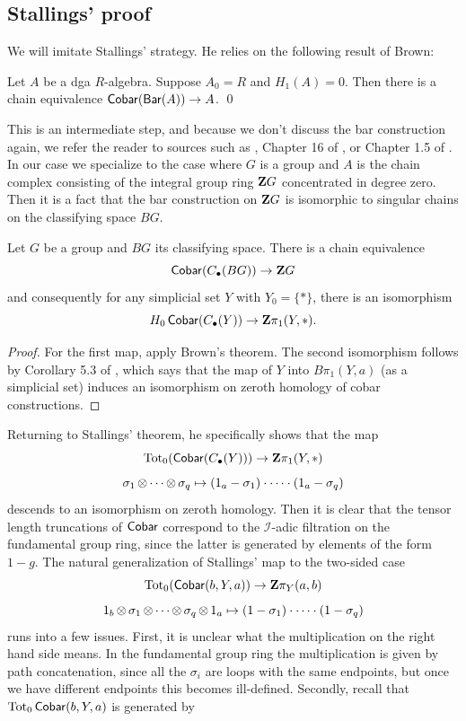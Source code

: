 \subsection{Stallings' proof} We will imitate Stallings' strategy. He relies on the following result of Brown:
\begin{thm}
    Let $A$ be a dga $R$-algebra. Suppose $A_0  = R$ and $H_1(A) = 0$. Then there is a chain equivalence $\operatorname{\mathsf{Cobar}}(\operatorname{\mathsf{Bar}}(A)) \to A$. \hfill \qed
\end{thm}
 This is an intermediate step, and because we don't discuss the bar construction again, we refer the reader to sources such as \cite{Milgram1967}, Chapter 16 of \cite{Brown1982}, or Chapter 1.5 of \cite{May1999-tb}. In our case we specialize to the case where $G$ is a group and $A$ is the chain complex consisting of the integral group ring $\mathbf{Z} G$ concentrated in degree zero. Then it is a fact that the bar construction on $\mathbf{Z} G$ is isomorphic to singular chains on the classifying space $BG$.
\begin{prop}\label{prop:cobar_zg}
    Let $G$ be a group and $BG$ its classifying space. There is a chain equivalence 
    \[\operatorname{\mathsf{Cobar}}(C_\bullet(BG)) \to \mathbf{Z} G\]
    and consequently for any simplicial set $Y$ with $Y_0 = \{*\}$, there is an isomorphism 
    \[H_0\operatorname{\mathsf{Cobar}}(C_\bullet(Y)) \to \mathbf{Z}\pi_1(Y,*).\]
    \begin{proof}
        For the first map, apply Brown's theorem. The second isomorphism follows by Corollary 5.3 of \cite{Stallings1975}, which says that the map of $Y$ into $B\pi_1(Y,a)$ (as a simplicial set) induces an isomorphism on zeroth homology of cobar constructions.
    \end{proof}
\end{prop}
Returning to Stallings' theorem, he specifically shows that the map 
\[\operatorname{Tot}_0(\operatorname{\mathsf{Cobar}}(C_\bullet(Y))) \to \mathbf{Z}\pi_1(Y,*)\]
\[\sigma_1 \operatorname{\otimes} \cdots \operatorname{\otimes} \sigma_q \mapsto (1_a- \sigma_1)\cdot \cdots \cdot (1_a - \sigma_q)\]
descends to an isomorphism on zeroth homology. Then it is clear that the tensor length truncations of $\operatorname{\mathsf{Cobar}}$ correspond to the $\mathcal{I}$-adic filtration on the fundamental group ring, since the latter is generated by elements of the form $1-g$. The natural generalization of Stallings' map to the two-sided case 
\[\operatorname{Tot}_0(\operatorname{\mathsf{Cobar}}(b,Y,a)) \to \mathbf{Z}\pi_Y(a,b)\]
\[1_b \operatorname{\otimes} \sigma_1 \operatorname{\otimes} \cdots \operatorname{\otimes} \sigma_q \operatorname{\otimes} 1_a \mapsto (1- \sigma_1)\cdot \cdots \cdot (1- \sigma_q)\]
runs into a few issues. First, it is unclear what the multiplication on the right hand side means. In the fundamental group ring the multiplication is given by path concatenation, since all the $\sigma_i$ are loops with the same endpoints, but once we have different endpoints this becomes ill-defined. Secondly, recall that $\operatorname{Tot}_0\operatorname{\mathsf{Cobar}}(b,Y,a)$ is generated by
